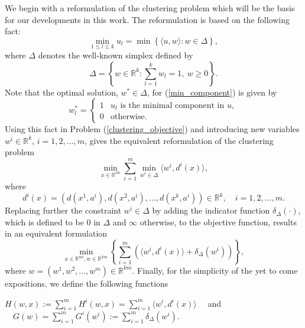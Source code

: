 We begin with a reformulation of the clustering problem which will be the basis for our developments in this work. The reformulation is based on the following fact:
\begin{equation}
	\min\limits_{1 \leq l \leq k} u_l = \min \left\lbrace \langle u,w \rangle : w \in \Delta \right\rbrace , \label{min_component}
\end{equation}
where $\Delta$ denotes the well-known simplex defined by
\begin{equation*}
	\Delta = \left\lbrace w \in \mathbb{R}^k : \sum\limits_{l=1}^{k} w_l = 1, \: w \geq 0 \right\rbrace .
\end{equation*}
Note that the optimal solution, $w^* \in \Delta$, for (\ref{min_component})  is given by
\begin{equation}
w^*_l = 
\begin{cases} 1 &u_l\mbox{ is the minimal component in }u,
\\ 0 &\mbox{otherwise}. \end{cases} \label{optimal_min_component}
\end{equation}
Using this fact in Problem (\ref{clustering_objective}) and introducing new variables $w^i \in \mathbb{R}^k$, $i=1,2, \ldots, m$, gives the equivalent reformulation of the clustering problem
\begin{equation}
	\min\limits_{x \in \mathbb{R}^{nk}} \sum\limits_{i=1}^{m} \min\limits_{w^i \in \Delta} \langle w^i , d^i(x) \rangle , \label{StateEq2}
\end{equation}
where 
\begin{equation}
d^{i}(x) = (d(x^1,a^i), d(x^2,a^i), \ldots , d(x^k,a^i)) \in \mathbb{R}^k, \quad i=1, 2, \ldots , m. \label{d^i_def}
\end{equation}
Replacing further the constraint $w^i \in \Delta$ by adding the indicator function $\delta_{\Delta}(\cdot)$, which is defined to be $0$ in $\Delta$ and $\infty$ otherwise, to the objective function, results in an equivalent formulation
\begin{equation}
	\min\limits_{x \in \mathbb{R}^{nk} , w \in \mathbb{R}^{km}} \left\lbrace \sum\limits_{i=1}^{m} \left( \langle w^i , d^i(x) \rangle + \delta_{\Delta}(w^i) \right) \right\rbrace , \label{StateEq3}
\end{equation}
where $w = (w^1, w^2, \ldots , w^m) \in \mathbb{R}^{km}$.
Finally, for the simplicity of the yet to come expositions, we define the following functions
\begin{center}
$H(w,x) := \sum\limits_{i=1}^{m} H^i(w,x) = \sum\limits_{i=1}^{m} \langle w^i , d^i(x) \rangle \quad$ and $\quad G(w) = \sum\limits_{i=1}^{m} G^i(w^i) := \sum\limits_{i=1}^{m} \delta_{\Delta}(w^i) .$
\end{center}

